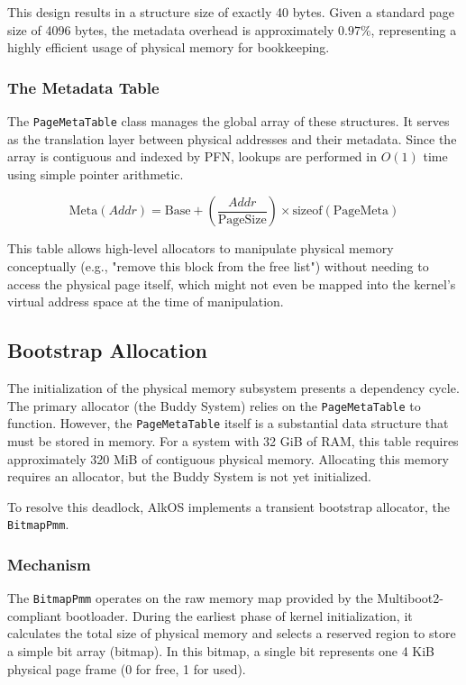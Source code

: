\documentclass[a4paper,10pt,twoside]{report}
\theoremstyle{definition}
\begin{document}
This design results in a structure size of exactly 40 bytes. Given a standard page size of 4096 bytes, the metadata overhead is approximately $0.97\%$, representing a highly efficient usage of physical memory for bookkeeping.

\subsubsection{The Metadata Table}

The \texttt{PageMetaTable} class manages the global array of these structures. It serves as the translation layer between physical addresses and their metadata. Since the array is contiguous and indexed by PFN, lookups are performed in $O(1)$ time using simple pointer arithmetic.

\begin{equation}
    \text{Meta}(Addr) = \text{Base} + \left( \frac{Addr}{\text{PageSize}} \right) \times \text{sizeof}(\text{PageMeta})
\end{equation}

This table allows high-level allocators to manipulate physical memory conceptually (e.g., "remove this block from the free list") without needing to access the physical page itself, which might not even be mapped into the kernel's virtual address space at the time of manipulation.


\subsection{Bootstrap Allocation}

The initialization of the physical memory subsystem presents a dependency cycle. The primary allocator (the Buddy System) relies on the \texttt{PageMetaTable} to function. However, the \texttt{PageMetaTable} itself is a substantial data structure that must be stored in memory. For a system with 32 GiB of RAM, this table requires approximately 320 MiB of contiguous physical memory. Allocating this memory requires an allocator, but the Buddy System is not yet initialized.

To resolve this deadlock, AlkOS implements a transient bootstrap allocator, the \texttt{BitmapPmm}.

\subsubsection{Mechanism}
The \texttt{BitmapPmm} operates on the raw memory map provided by the Multiboot2-compliant bootloader. During the earliest phase of kernel initialization, it calculates the total size of physical memory and selects a reserved region to store a simple bit array (bitmap). In this bitmap, a single bit represents one 4 KiB physical page frame (0 for free, 1 for used).
\end{document}
